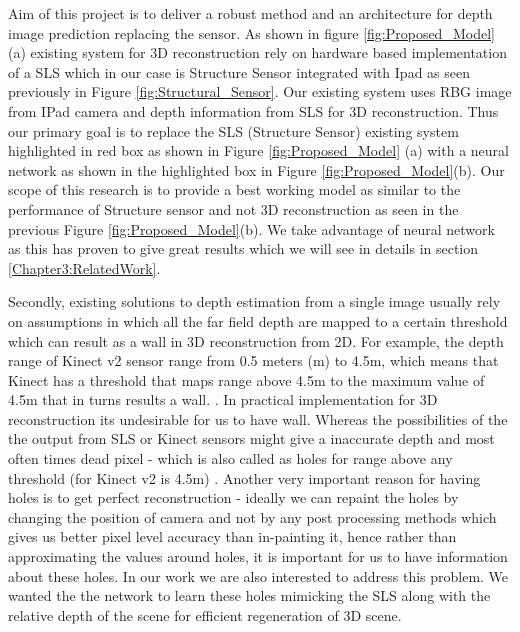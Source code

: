 Aim of this project is to deliver a robust method and an architecture for depth image prediction replacing the sensor. As shown in figure \ref{fig:Proposed_Model} (a) existing system for 3D reconstruction rely on hardware based implementation of a SLS which in our case is Structure Sensor integrated with Ipad as seen previously in Figure \ref{fig:Structural_Sensor}. Our existing system uses RBG image from IPad camera and depth information from SLS for 3D reconstruction. Thus our primary goal is to replace the SLS (Structure Sensor) existing system highlighted in red box as shown in Figure \ref{fig:Proposed_Model} (a) with a neural network as shown in the highlighted box in Figure \ref{fig:Proposed_Model}(b). Our scope of this research is to provide a best working model as similar to the performance of Structure sensor and not 3D reconstruction as seen in the previous Figure \ref{fig:Proposed_Model}(b).  We take advantage of neural network as this has proven to give great results which we will see in details in section \ref{Chapter3:RelatedWork}.


Secondly, existing solutions to depth estimation from a single image usually rely on assumptions in which all the far field depth are mapped to a certain threshold which can result as a wall in 3D reconstruction from 2D. For example, the depth range of Kinect v2 sensor range from 0.5 meters (m) to 4.5m, which means that Kinect has a threshold that maps range above 4.5m to the maximum value of 4.5m that in turns results a wall. \cite{Silberman:ECCV12}. In practical implementation for 3D reconstruction its undesirable for us to have wall. Whereas the possibilities of the the output from SLS or Kinect sensors might give a inaccurate depth and most often times dead pixel - which is also called as holes for range above any threshold (for Kinect v2 is 4.5m) \cite{kinecttof}. Another very important reason for having holes is to get perfect reconstruction - ideally we can repaint the holes by changing the position of camera and not by any post processing methods which gives us better pixel level accuracy than in-painting it, hence rather than approximating the values around holes, it is important for us to have information about these holes. In our work we are also interested to address this problem. We wanted the the network to learn these holes mimicking the SLS along with the relative depth of the scene for efficient regeneration of 3D scene. 

